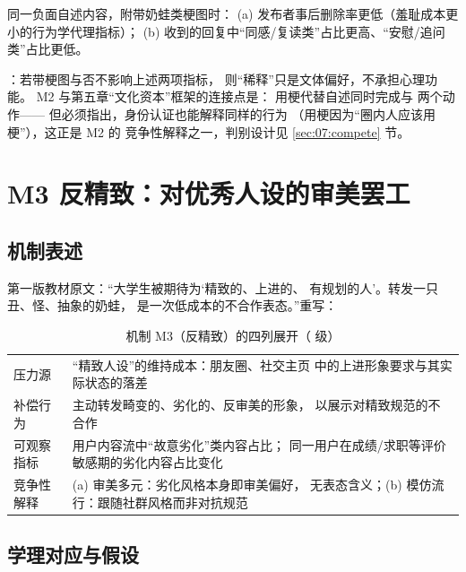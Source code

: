\begin{hypothesis}[H7.2 群体稀释假设]\label{hyp:07:m2}
  同一负面自述内容，附带奶蛙类梗图时：
  (a) 发布者事后删除率更低（羞耻成本更小的行为学代理指标）；
  (b) 收到的回复中“同感/复读类”占比更高、“安慰/追问类”占比更低。
\end{hypothesis}

：若带梗图与否不影响上述两项指标，
则“稀释”只是文体偏好，不承担心理功能。
M2 与第五章“文化资本”框架的连接点是：
用梗代替自述同时完成与
两个动作\cite{nissenbaum2015contested}——
但必须指出，身份认证也能解释同样的行为
（用梗因为“圈内人应该用梗”），这正是 M2 的
竞争性解释之一，判别设计见 \ref{sec:07:compete} 节。

\section{M3 反精致：对优秀人设的审美罢工}\label{sec:07:m3}

\subsection{机制表述}

第一版教材原文：“大学生被期待为‘精致的、上进的、
有规划的人’。转发一只丑、怪、抽象的奶蛙，
是一次低成本的不合作表态。”重写：

\begin{table}[htbp]\centering
  \caption{机制 M3（反精致）的四列展开（ 级）}
  \label{tab:07:m3}
  \small
  \begin{tabularx}{\textwidth}{@{}lX@{}}
    \toprule
    压力源 & “精致人设”的维持成本：朋友圈、社交主页
      中的上进形象要求与其实际状态的落差 \\
    补偿行为 & 主动转发畸变的、劣化的、反审美的形象，
      以展示对精致规范的不合作 \\
    可观察指标 & 用户内容流中“故意劣化”类内容占比；
      同一用户在成绩/求职等评价敏感期的劣化内容占比变化 \\
    竞争性解释 & (a) 审美多元：劣化风格本身即审美偏好，
      无表态含义；(b) 模仿流行：跟随社群风格而非对抗规范 \\
    \bottomrule
  \end{tabularx}
\end{table}

\subsection{学理对应与假设}

